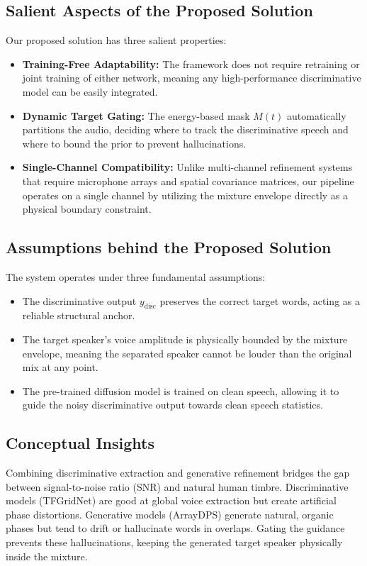 \documentclass[conference]{IEEEtran}
\begin{document}
\subsection{Salient Aspects of the Proposed Solution}
Our proposed solution has three salient properties:
\begin{itemize}
    \item \textbf{Training-Free Adaptability:} The framework does not require retraining or joint training of either network, meaning any high-performance discriminative model can be easily integrated.
    \item \textbf{Dynamic Target Gating:} The energy-based mask $M(t)$ automatically partitions the audio, deciding where to track the discriminative speech and where to bound the prior to prevent hallucinations.
    \item \textbf{Single-Channel Compatibility:} Unlike multi-channel refinement systems that require microphone arrays and spatial covariance matrices, our pipeline operates on a single channel by utilizing the mixture envelope directly as a physical boundary constraint.
\end{itemize}

\subsection{Assumptions behind the Proposed Solution}
The system operates under three fundamental assumptions:
\begin{itemize}
    \item The discriminative output $y_{\text{disc}}$ preserves the correct target words, acting as a reliable structural anchor.
    \item The target speaker's voice amplitude is physically bounded by the mixture envelope, meaning the separated speaker cannot be louder than the original mix at any point.
    \item The pre-trained diffusion model is trained on clean speech, allowing it to guide the noisy discriminative output towards clean speech statistics.
\end{itemize}

\subsection{Conceptual Insights}
Combining discriminative extraction and generative refinement bridges the gap between signal-to-noise ratio (SNR) and natural human timbre. Discriminative models (TFGridNet) are good at global voice extraction but create artificial phase distortions. Generative models (ArrayDPS) generate natural, organic phases but tend to drift or hallucinate words in overlaps. Gating the guidance prevents these hallucinations, keeping the generated target speaker physically inside the mixture.
\end{document}
